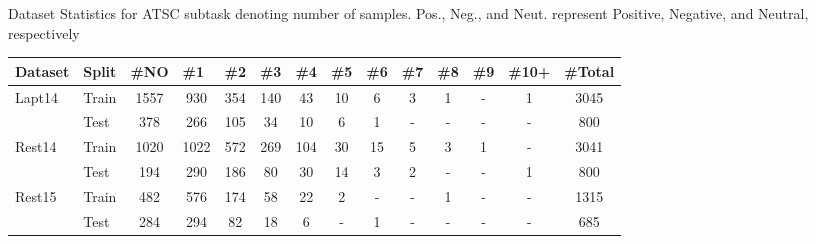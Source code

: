 \documentclass[11pt]{article}
\begin{document}
\begin{table}[H]
\caption{Dataset Statistics for ATSC subtask denoting number of samples. Pos., Neg., and Neut. represent Positive, Negative, and Neutral, respectively}
\label{tab:dataset_description_2}
\end{table} \begin{table*}[]
\centering
\resizebox{\textwidth}{!}
{
\begin{tabular}{l|l|c|c|c|c|c|c|c|c|c|c|c|c}
\hline
Dataset     & Split & \multicolumn{1}{l|}{\#NO} & \multicolumn{1}{l|}{\#1} & \multicolumn{1}{l|}{\#2} & \multicolumn{1}{l|}{\#3} & \multicolumn{1}{l|}{\#4} & \multicolumn{1}{l|}{\#5} & \multicolumn{1}{l|}{\#6} & \multicolumn{1}{l|}{\#7} & \multicolumn{1}{l|}{\#8} & \multicolumn{1}{l|}{\#9} & \multicolumn{1}{l|}{\#10+} & \multicolumn{1}{l}{\#Total} \\ \hline
Lapt14     & Train & 1557                       & 930                       & 354                       & 140                       & 43                        & 10                        & 6                         & 3                         & 1    & -         & 1     & 3045                        \\
            & Test  & 378                        & 266                       & 105                       & 34                        & 10                        & 6                         & 1                         & -    & -                         & -                         & -                          & 800                         \\ \hline
            
Rest14 & Train & 1020                       & 1022                      & 572                       & 269                       & 104                       & 30                        & 15                        & 5                         & 3             & 1                     & -                          & 3041                        \\
            & Test  & 194                        & 290                       & 186                       & 80                        & 30                        & 14                        & 3                 & 2                         & -                         & -                         & 1    & 800                         \\ \hline


Rest15 & Train & 482                       & 576                      & 174                       & 58                       & 22                       & 2                        & -                        & -                         & 1    & -                    & -                          & 1315                        \\
    & Test  & 284                        & 294                       & 82                       & 18                        & 6                        & -                        & 1                         & -                         & -                         & -                         & -     & 685                         \\ \hline



\end{tabular}}
\end{table*}
\end{document}
